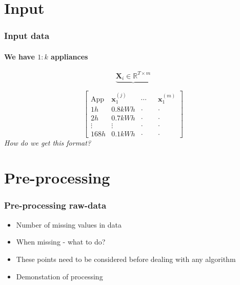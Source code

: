 \documentclass[gray]{beamer}
\begin{document}
\section{Input}
\begin{frame}
\frametitle{Input data}
\framesubtitle{We have $1:k$ appliances}
\centering
\begin{equation*}
\underbrace{\mathbf{X}_i \in \mathbb{R}^{T \times m}}
\end{equation*}

\begin{equation*}
\begin{bmatrix}
\text{App} & \mathbf{x}_1^{(j)} & \cdots & & \mathbf{x}_1^{(m)}\\
1h & 0.8 kWh & \cdot & & \cdot \\
2h & 0.7 kWh & \cdot & & \cdot \\
\vdots & \vdots & \cdot & & \cdot \\
168h & 0.1kWh & \cdot & &  \cdot
\end{bmatrix}
\end{equation*}
\textit{How do we get this format?}
\end{frame}
\section{Pre-processing}
\begin{frame}
	\frametitle{Pre-processing raw-data}
	\begin{itemize}
		\item{Number of missing values in data}
		\item{When missing - what to do?}
		\item{These points need to be considered before dealing with any algorithm}
		\item{Demonstation of processing}
	\end{itemize}
\end{frame}
\end{document}
